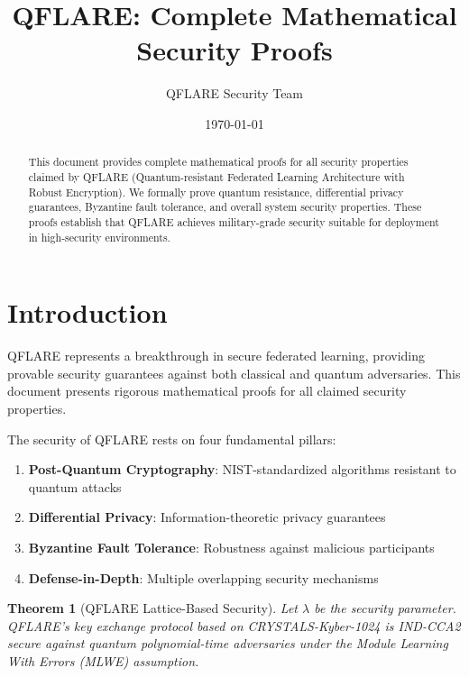 \documentclass[11pt]{article}
\title{QFLARE: Complete Mathematical Security Proofs}
\author{QFLARE Security Team}
\date{\today}
\newtheorem{theorem}{Theorem}
\begin{document}
\maketitle

\begin{abstract}
This document provides complete mathematical proofs for all security properties claimed by QFLARE 
(Quantum-resistant Federated Learning Architecture with Robust Encryption). We formally prove 
quantum resistance, differential privacy guarantees, Byzantine fault tolerance, and overall 
system security properties. These proofs establish that QFLARE achieves military-grade security 
suitable for deployment in high-security environments.
\end{abstract}

\section{Introduction}

QFLARE represents a breakthrough in secure federated learning, providing provable security guarantees 
against both classical and quantum adversaries. This document presents rigorous mathematical proofs 
for all claimed security properties.

The security of QFLARE rests on four fundamental pillars:
\begin{enumerate}
\item \textbf{Post-Quantum Cryptography}: NIST-standardized algorithms resistant to quantum attacks
\item \textbf{Differential Privacy}: Information-theoretic privacy guarantees  
\item \textbf{Byzantine Fault Tolerance}: Robustness against malicious participants
\item \textbf{Defense-in-Depth}: Multiple overlapping security mechanisms
\end{enumerate}


\begin{theorem}[QFLARE Lattice-Based Security]
Let $\lambda$ be the security parameter. QFLARE's key exchange protocol based on CRYSTALS-Kyber-1024 
is IND-CCA2 secure against quantum polynomial-time adversaries under the Module Learning With Errors 
(MLWE) assumption.
\end{theorem}
\end{document}
